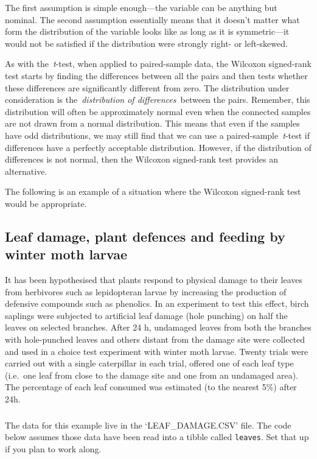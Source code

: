\documentclass[
]{book}
\newenvironment{greybox}{
  \definecolor{shadecolor}{rgb}{0.95,0.95,0.95}  %
  \color{black}
  \begin{shaded}}
 {\end{shaded}}
\newenvironment{infobox}[1]
  {
  \begin{itemize}
  \renewcommand{\labelitemi}{
    \raisebox{-.7\height}[0pt][0pt]{
      {\setkeys{Gin}{width=3em,keepaspectratio}
        \texttt{[image: images/\#1]}}
    }
  }
  \setlength{\fboxsep}{1em}
  \begin{greybox}
  \item
  }
  {
  \end{greybox}
  \end{itemize}
  }
\begin{document}
The first assumption is simple enough---the variable can be anything but nominal. The second assumption essentially means that it doesn't matter what form the distribution of the variable looks like as long as it is symmetric---it would not be satisfied if the distribution were strongly right- or left-skewed.

As with the~\emph{t}-test, when applied to paired-sample data, the Wilcoxon signed-rank test starts by finding the differences between all the pairs and then tests whether these differences are significantly different from zero. The distribution under consideration is the~\emph{distribution of differences}~between the pairs. Remember, this distribution will often be approximately normal even when the connected samples are not drawn from a normal distribution. This means that even if the samples have odd distributions, we may still find that we can use a paired-sample~\emph{t}-test if differences have a perfectly acceptable distribution. However, if the distribution of differences is not normal, then the Wilcoxon signed-rank test provides an alternative.

The following is an example of a situation where the Wilcoxon signed-rank test would be appropriate.

\hypertarget{leaf-damage-plant-defences-and-feeding-by-winter-moth-larvae}{%
\subsection{Leaf damage, plant defences and feeding by winter moth larvae}\label{leaf-damage-plant-defences-and-feeding-by-winter-moth-larvae}}

It has been hypothesised that plants respond to physical damage to their leaves from herbivores such as lepidopteran larvae by increasing the production of defensive compounds such as phenolics. In an experiment to test this effect, birch saplings were subjected to artificial leaf damage (hole punching) on half the leaves on selected branches. After 24 h, undamaged leaves from both the branches with hole-punched leaves and others distant from the damage site were collected and used in a choice test experiment with winter moth larvae. Twenty trials were carried out with a single caterpillar in each trial, offered one of each leaf type (i.e.~one leaf from close to the damage site and one from an undamaged area). The percentage of each leaf consumed was estimated (to the nearest 5\%) after 24h.

\begin{infobox}{action}

\hypertarget{section-21}{%
\subsubsection*{}\label{section-21}}

The data for this example live in the `LEAF\_DAMAGE.CSV' file. The code below assumes those data have been read into a tibble called \texttt{leaves}. Set that up if you plan to work along.

\end{infobox}
\end{document}
